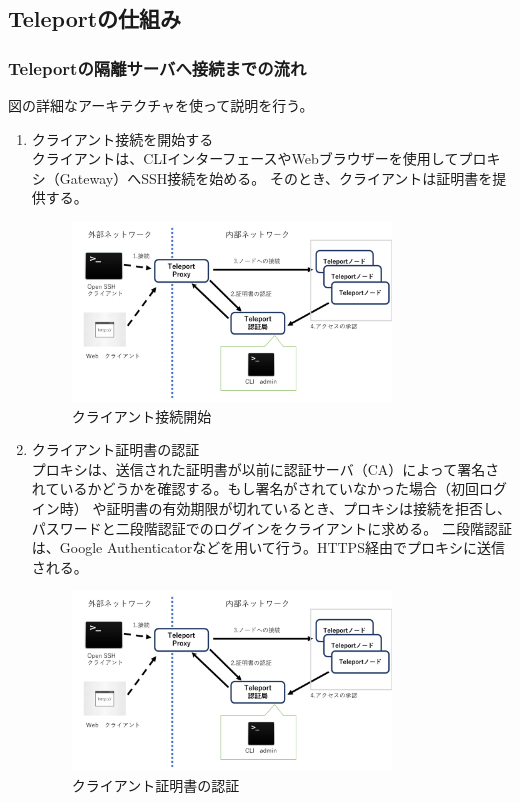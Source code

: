 \documentclass[11pt,a4j,titlepage]{jreport}
\begin{document}
\subsection*{Teleportの仕組み}
\subsubsection*{Teleportの隔離サーバへ接続までの流れ}
図の詳細なアーキテクチャを使って説明を行う。

\begin{enumerate}[1:]
    \setlength{\parskip}{0.1cm} %
    \setlength{\itemsep}{0.1cm}

    \item クライアント接続を開始する\mbox{}\\クライアントは、CLIインターフェースやWebブラウザーを使用してプロキシ（Gateway）へSSH接続を始める。
    そのとき、クライアントは証明書を提供する。\\
    \begin{figure}[tbp]
        \centering
        \includegraphics*[width=0.8\textwidth,page=2]{graphs/teleport_archtecture.pdf}
        \caption{クライアント接続開始}
        \label{teleport_connect}
    \end{figure}


    \item クライアント証明書の認証\mbox{}\\
    プロキシは、送信された証明書が以前に認証サーバ（CA）によって署名されているかどうかを確認する。もし署名がされていなかった場合（初回ログイン時）
    や証明書の有効期限が切れているとき、プロキシは接続を拒否し、パスワードと二段階認証でのログインをクライアントに求める。
    二段階認証は、Google Authenticatorなどを用いて行う。HTTPS経由でプロキシに送信される。
    \begin{figure}[tbp]
        \centering
        \includegraphics*[width=0.8\textwidth,page=3]{graphs/teleport_archtecture.pdf}
        \caption{クライアント証明書の認証}
        \label{teleport_certificate}
    \end{figure}


\end{enumerate}
\end{document}
